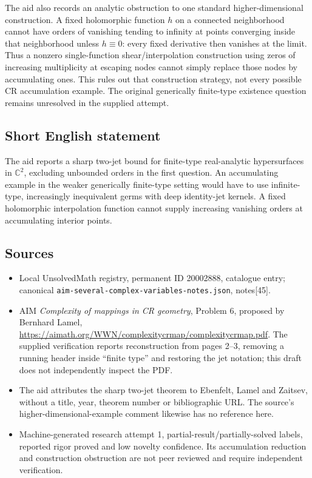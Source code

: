 \documentclass[11pt]{article}
\newcommand{\C}{\mathbb{C}}
\begin{document}
The aid also records an analytic obstruction to one standard higher-dimensional construction. A fixed holomorphic function \(h\) on a connected neighborhood cannot have orders of vanishing tending to infinity at points converging inside that neighborhood unless \(h\equiv0\): every fixed derivative then vanishes at the limit. Thus a nonzero single-function shear/interpolation construction using zeros of increasing multiplicity at escaping nodes cannot simply replace those nodes by accumulating ones. This rules out that construction strategy, not every possible CR accumulation example. The original generically finite-type existence question remains unresolved in the supplied attempt.
\subsection{Short English statement}
The aid reports a sharp two-jet bound for finite-type real-analytic hypersurfaces in \(\C^2\), excluding unbounded orders in the first question. An accumulating example in the weaker generically finite-type setting would have to use infinite-type, increasingly inequivalent germs with deep identity-jet kernels. A fixed holomorphic interpolation function cannot supply increasing vanishing orders at accumulating interior points.
\subsection{Sources}
\begin{itemize}
\item Local UnsolvedMath registry, permanent ID 20002888, catalogue entry; canonical \texttt{aim-several-complex-variables-notes.json}, notes[45].
\item AIM \emph{Complexity of mappings in CR geometry}, Problem 6, proposed by Bernhard Lamel, \url{https://aimath.org/WWN/complexitycrmap/complexitycrmap.pdf}. The supplied verification reports reconstruction from pages 2--3, removing a running header inside ``finite type'' and restoring the jet notation; this draft does not independently inspect the PDF.
\item The aid attributes the sharp two-jet theorem to Ebenfelt, Lamel and Zaitsev, without a title, year, theorem number or bibliographic URL. The source's higher-dimensional-example comment likewise has no reference here.
\item Machine-generated research attempt 1, partial-result/partially-solved labels, reported rigor proved and low novelty confidence. Its accumulation reduction and construction obstruction are not peer reviewed and require independent verification.
\end{itemize}
\end{document}
